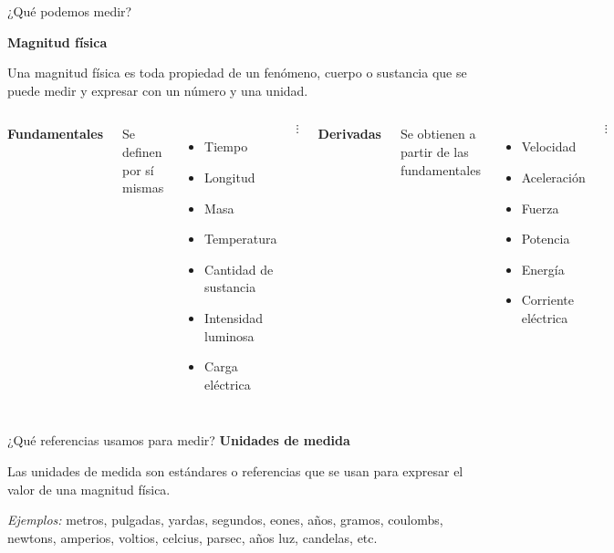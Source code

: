 \begin{frame}{¿Qué podemos medir?}

\textbf{Magnitud física}

    Una magnitud física es toda propiedad de un fenómeno, cuerpo o sustancia que se puede medir y expresar con un número y una unidad.
    
    \vspace{1em}

    \begin{columns}
        \textbf{Fundamentales}
        
        Se definen por sí mismas
        \begin{itemize}
            \item Tiempo
            \item Longitud
            \item Masa
            \item Temperatura
            \item Cantidad de sustancia
            \item Intensidad luminosa
            \item Carga eléctrica
        \end{itemize}
        $$\vdots$$
        
        \textbf{Derivadas}
        
        Se obtienen a partir de las fundamentales
        \begin{itemize}
            \item Velocidad
            \item Aceleración
            \item Fuerza
            \item Potencia
            \item Energía
            \item Corriente eléctrica
        \end{itemize}
        $$\vdots$$
    \end{columns}
\end{frame}

\begin{frame}{¿Qué referencias usamos para medir?}
\textbf{Unidades de medida}

Las unidades de medida son estándares o referencias que se usan para expresar el valor de una magnitud física.

\vspace{1em}

\textit{Ejemplos:} metros, pulgadas, yardas, segundos, eones, años, gramos, coulombs, newtons, amperios, voltios, celcius, parsec, años luz, candelas, etc.

\end{frame}

